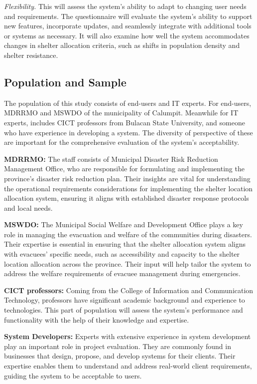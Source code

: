 	\textit{Flexibility.} This will assess the system’s ability to adapt to changing user needs and requirements. The questionnaire will evaluate the system's ability to support new features, incorporate updates, and seamlessly integrate with additional tools or systems as necessary. It will also examine how well the system accommodates changes in shelter allocation criteria, such as shifts in population density and shelter resistance.
	

\subsection{Population and Sample}
	The population of this study consists of end-users and IT experts. For end-users,  MDRRMO and MSWDO of the municipality of Calumpit. Meanwhile for IT experts, includes CICT professors from Bulacan State University, and someone who have experience in developing a system.  The diversity of perspective of these are important for the comprehensive evaluation of the system’s acceptability.
	
	\textbf{MDRRMO:} The staff consists of Municipal Disaster Risk Reduction Management Office, who are responsible for formulating and implementing the province's disaster risk reduction plan.  Their insights are vital for understanding the operational requirements considerations for implementing the shelter location allocation system, ensuring it aligns with established disaster response protocols and local needs.
	
	\textbf{MSWDO:} The Municipal Social Welfare and Development Office plays a key role in managing the evacuation and welfare of the communities during disasters. Their expertise is essential in ensuring that the shelter allocation system aligns with evacuees' specific needs, such as accessibility and capacity to the shelter location allocation across the province. Their input will help tailor the system to address the welfare requirements of evacuee management during emergencies.
	
	\textbf{CICT professors:} Coming from the College of Information and Communication Technology, professors have significant academic background and experience to technologies. This part of population will assess the system's performance and functionality with the help of their knowledge and expertise.
	
	\textbf{System Developers:} Experts with extensive experience in system development play an important role in project evaluation. They are commonly found in businesses that design, propose, and develop systems for their clients. Their expertise enables them to understand and address real-world client requirements, guiding the system to be acceptable to users.
	
